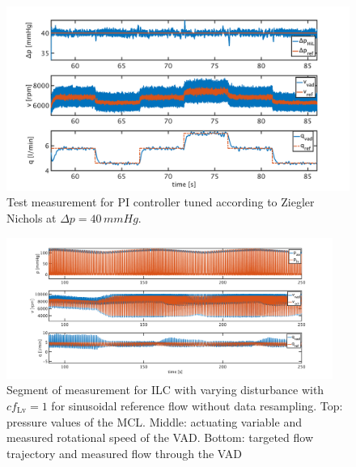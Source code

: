 \begin{figure}[ht!]
  \centering
  \includegraphics[width=\textwidth]{images/chapt_5/pi_contr_zn_40.pdf}
  \caption[Test measurement for PI controller tuned according to Ziegler Nichols at $\Delta{p}=40\,mmHg$]{Test measurement for PI controller tuned according to Ziegler Nichols at $\Delta{p}=40\,mmHg$.}
  \label{fig:anh_8}
\end{figure}


\begin{figure}[ht!]
  \centering
  \includegraphics[width=0.95\textwidth]{images/chapt_5/ILC/ilc_var_dist_unfix_sine.pdf}
  \caption[Segment of measurement for ILC with varying disturbance with $cf_{\mathrm{Lv}}=1$ for sinusoidal reference flow without data resampling]{Segment of measurement for ILC with varying disturbance with $cf_{\mathrm{Lv}}=1$ for sinusoidal reference flow without data resampling. Top:  pressure values of the MCL. Middle: actuating variable and measured rotational speed of the VAD. Bottom: targeted flow trajectory and measured flow through the VAD}
 \label{fig:anh_9}
\end{figure}

